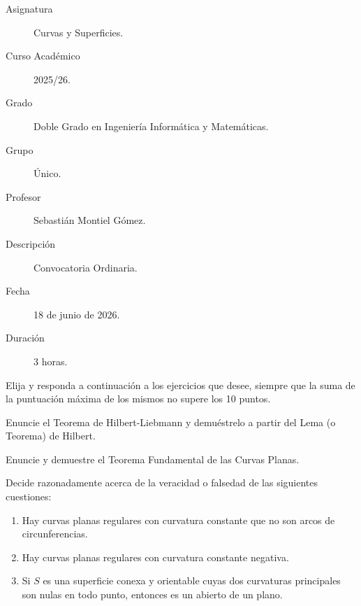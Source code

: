 \documentclass[12pt]{article}
\begin{document}

    
    

    \begin{description}
        \item[Asignatura] Curvas y Superficies.
        \item[Curso Académico] 2025/26.
        \item[Grado] Doble Grado en Ingeniería Informática y Matemáticas.
        \item[Grupo] Único.
        \item[Profesor] Sebastián Montiel Gómez.
        \item[Descripción] Convocatoria Ordinaria.
        \item[Fecha] 18 de junio de 2026.
        \item[Duración] 3 horas.
    \end{description}
    \newpage


    
    \noindent
    Elija y responda a continuación a los ejercicios que desee, siempre que la suma de la puntuación máxima de los mismos no supere los 10 puntos.

    \begin{ejercicio}[4 puntos]
        Enuncie el Teorema de Hilbert-Liebmann y demuéstrelo a partir del Lema (o Teorema) de Hilbert.
    \end{ejercicio}

    \begin{ejercicio}[4 puntos]
        Enuncie y demuestre el Teorema Fundamental de las Curvas Planas.
    \end{ejercicio}

    \begin{ejercicio}[2.5 puntos]
        Decide razonadamente acerca de la veracidad o falsedad de las siguientes cuestiones:
        \begin{enumerate}[label=\alph*)]
            \item Hay curvas planas regulares con curvatura constante que no son arcos de circunferencias.
            \item Hay curvas planas regulares con curvatura constante negativa.
            \item Si $S$ es una superficie conexa y orientable cuyas dos curvaturas principales son nulas en todo punto, entonces es un abierto de un plano.
        \end{enumerate}
    \end{ejercicio}
\end{document}
